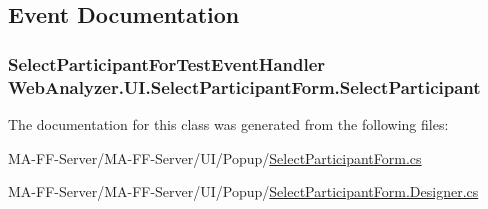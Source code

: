 \subsection{Event Documentation}
\hypertarget{class_web_analyzer_1_1_u_i_1_1_select_participant_form_af1734ad8760e4e4f42579efafcb7299d}{}
\subsubsection[{Select\+Participant}]{\setlength{\rightskip}{0pt plus 5cm}Select\+Participant\+For\+Test\+Event\+Handler Web\+Analyzer.\+U\+I.\+Select\+Participant\+Form.\+Select\+Participant}\label{class_web_analyzer_1_1_u_i_1_1_select_participant_form_af1734ad8760e4e4f42579efafcb7299d}


The documentation for this class was generated from the following files\+:\begin{DoxyCompactItemize}
\item 
M\+A-\/\+F\+F-\/\+Server/\+M\+A-\/\+F\+F-\/\+Server/\+U\+I/\+Popup/\hyperlink{_select_participant_form_8cs}{Select\+Participant\+Form.\+cs}\item 
M\+A-\/\+F\+F-\/\+Server/\+M\+A-\/\+F\+F-\/\+Server/\+U\+I/\+Popup/\hyperlink{_select_participant_form_8_designer_8cs}{Select\+Participant\+Form.\+Designer.\+cs}\end{DoxyCompactItemize}
